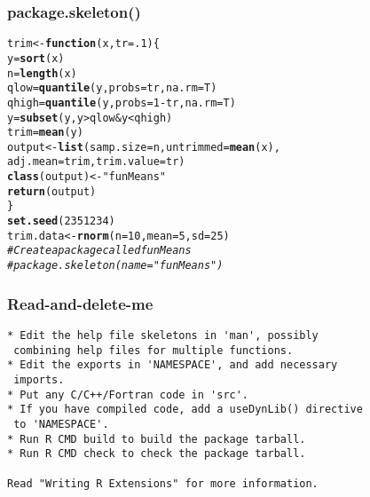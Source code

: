 \documentclass[xcolor=svgnames]{beamer}\usepackage[]{graphicx}\usepackage[]{color}
\makeatletter
\newcommand{\hlnum}[1]{\textcolor[rgb]{0.686,0.059,0.569}{#1}}%
\newcommand{\hlstr}[1]{\textcolor[rgb]{0.192,0.494,0.8}{#1}}%
\newcommand{\hlcom}[1]{\textcolor[rgb]{0.678,0.584,0.686}{\textit{#1}}}%
\newcommand{\hlopt}[1]{\textcolor[rgb]{0,0,0}{#1}}%
\newcommand{\hlstd}[1]{\textcolor[rgb]{0.345,0.345,0.345}{#1}}%
\newcommand{\hlkwa}[1]{\textcolor[rgb]{0.161,0.373,0.58}{\textbf{#1}}}%
\newcommand{\hlkwb}[1]{\textcolor[rgb]{0.69,0.353,0.396}{#1}}%
\newcommand{\hlkwc}[1]{\textcolor[rgb]{0.333,0.667,0.333}{#1}}%
\newcommand{\hlkwd}[1]{\textcolor[rgb]{0.737,0.353,0.396}{\textbf{#1}}}%
\newenvironment{kframe}{%
 \def\at@end@of@kframe{}%
 \ifinner\ifhmode%
  \def\at@end@of@kframe{\end{minipage}}%
  \begin{minipage}{\columnwidth}%
 \fi\fi%
 \def\FrameCommand##1{\hskip\@totalleftmargin \hskip-\fboxsep
 \colorbox{shadecolor}{##1}\hskip-\fboxsep
     \hskip-\linewidth \hskip-\@totalleftmargin \hskip\columnwidth}%
 \MakeFramed {\advance\hsize-\width
   \@totalleftmargin\z@ \linewidth\hsize
   \@setminipage}}%
 {\par\unskip\endMakeFramed%
 \at@end@of@kframe}
\newenvironment{knitrout}{}{} %
\makeatother
\begin{document}
\begin{frame}[fragile]
  \frametitle{package.skeleton()}
\begin{knitrout}
\color{fgcolor}\begin{kframe}
\begin{alltt}
\hlstd{trim} \hlkwb{<-} \hlkwa{function}\hlstd{(}\hlkwc{x}\hlstd{,}\hlkwc{tr}\hlstd{=}\hlnum{.1}\hlstd{)\{}
    \hlstd{y}\hlkwb{=}\hlkwd{sort}\hlstd{(x)}
    \hlstd{n}\hlkwb{=}\hlkwd{length}\hlstd{(x)}
    \hlstd{qlow}\hlkwb{=}\hlkwd{quantile}\hlstd{(y,}\hlkwc{probs}\hlstd{=tr,}\hlkwc{na.rm}\hlstd{=T)}
    \hlstd{qhigh}\hlkwb{=}\hlkwd{quantile}\hlstd{(y,}\hlkwc{probs}\hlstd{=}\hlnum{1}\hlopt{-}\hlstd{tr,}\hlkwc{na.rm}\hlstd{=T)}
    \hlstd{y}\hlkwb{=}\hlkwd{subset}\hlstd{(y,y} \hlopt{>} \hlstd{qlow} \hlopt{&} \hlstd{y} \hlopt{<} \hlstd{qhigh)}
    \hlstd{trim}\hlkwb{=}\hlkwd{mean}\hlstd{(y)}
    \hlstd{output} \hlkwb{<-} \hlkwd{list}\hlstd{(}\hlkwc{samp.size} \hlstd{= n,} \hlkwc{untrimmed} \hlstd{=} \hlkwd{mean}\hlstd{(x),}
                   \hlkwc{adj.mean} \hlstd{= trim,} \hlkwc{trim.value} \hlstd{= tr)}
    \hlkwd{class}\hlstd{(output)} \hlkwb{<-} \hlstr{"funMeans"}
    \hlkwd{return}\hlstd{(output)}
\hlstd{\}}
\hlkwd{set.seed}\hlstd{(}\hlnum{2351234}\hlstd{)}
\hlstd{trim.data} \hlkwb{<-} \hlkwd{rnorm}\hlstd{(}\hlkwc{n} \hlstd{=} \hlnum{10}\hlstd{,} \hlkwc{mean} \hlstd{=} \hlnum{5}\hlstd{,} \hlkwc{sd} \hlstd{=} \hlnum{25}\hlstd{)}
\hlcom{# Create a package called funMeans}
\hlcom{#package.skeleton(name = "funMeans")  }
\end{alltt}
\end{kframe}
\end{knitrout}

\end{frame}

\begin{frame}[fragile]
  \frametitle{Read-and-delete-me}
  \begin{verbatim}
* Edit the help file skeletons in 'man', possibly
 combining help files for multiple functions.
* Edit the exports in 'NAMESPACE', and add necessary
 imports.
* Put any C/C++/Fortran code in 'src'.
* If you have compiled code, add a useDynLib() directive
 to 'NAMESPACE'.
* Run R CMD build to build the package tarball.
* Run R CMD check to check the package tarball.

Read "Writing R Extensions" for more information.
\end{verbatim}
\end{frame}
\end{document}
